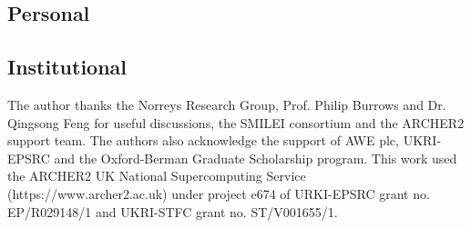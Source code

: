 \subsection*{Personal}

\subsection*{Institutional}

The author thanks the Norreys Research Group, Prof. Philip Burrows and Dr. Qingsong Feng for useful discussions, the SMILEI consortium and the ARCHER2 support team. The authors also acknowledge the support of AWE plc, UKRI-EPSRC and the Oxford-Berman Graduate Scholarship program. This work used the ARCHER2 UK National Supercomputing Service (https://www.archer2.ac.uk) under project e674 of URKI-EPSRC grant no. EP/R029148/1 and UKRI-STFC grant no. ST/V001655/1.